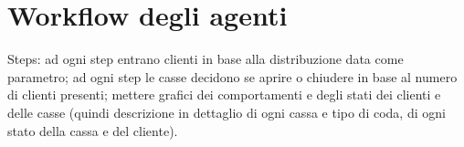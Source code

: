 \section{Workflow degli agenti}


Steps: ad ogni step entrano clienti in base alla distribuzione data come parametro; ad ogni step le casse decidono se aprire o chiudere in base al numero di clienti presenti; mettere grafici dei comportamenti e degli stati dei clienti e delle casse (quindi descrizione in dettaglio di ogni cassa e tipo di coda, di ogni stato della cassa e del cliente).